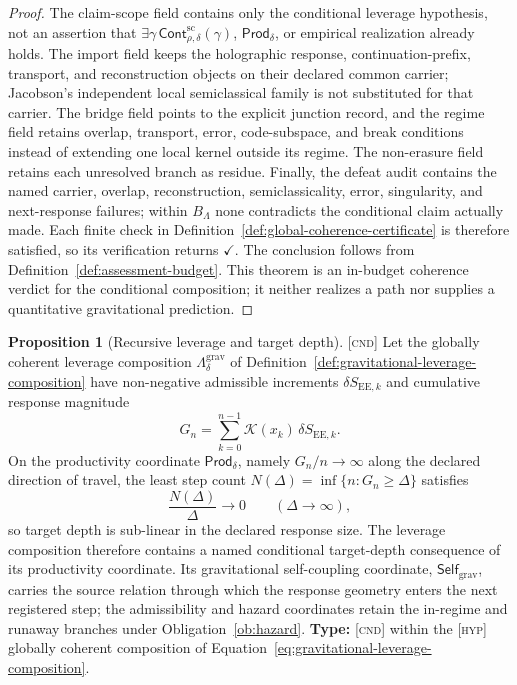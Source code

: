 \documentclass[11pt]{article}
\newcommand{\Cnd}{\textsc{[cnd]}}
\newcommand{\Hyp}{\textsc{[hyp]}}
\theoremstyle{definition}
\newtheorem{sproposition}{Proposition}
\begin{document}
\begin{proof}
The claim-scope field contains only the conditional leverage hypothesis, not an
assertion that $\exists\gamma\,\mathsf{Cont}^{\mathrm{sc}}_{\rho,\delta}(\gamma)$,
$\mathsf{Prod}_\delta$, or empirical realization already holds. The import field
keeps the holographic response, continuation-prefix, transport, and reconstruction
objects on their declared common carrier; Jacobson's independent local
semiclassical family is not substituted for that carrier. The bridge field points
to the explicit junction record, and the regime field retains overlap, transport,
error, code-subspace, and break conditions instead of extending one local kernel
outside its regime. The non-erasure field retains each unresolved branch as
residue. Finally, the defeat audit contains the named carrier, overlap,
reconstruction, semiclassicality, error, singularity, and next-response failures;
within $B_\Lambda$ none contradicts the conditional claim actually made. Each
finite check in Definition~\ref{def:global-coherence-certificate} is therefore
satisfied, so its verification returns $\checkmark$. The conclusion follows from
Definition~\ref{def:assessment-budget}. This theorem is an in-budget coherence
verdict for the conditional composition; it neither realizes a path nor supplies a
quantitative gravitational prediction.
\end{proof}

\begin{sproposition}[Recursive leverage and target depth]\label{prop:amplify}
\Cnd{} Let the globally coherent leverage composition
$\Lambda^{\mathrm{grav}}_\delta$ of
Definition~\ref{def:gravitational-leverage-composition} have non-negative
admissible increments $\delta S_{\mathrm{EE},k}$ and cumulative response magnitude
\begin{equation}
G_n=\sum_{k=0}^{n-1}\mathcal K(x_k)\,\delta S_{\mathrm{EE},k}.
\label{eq:cumulative-response}
\end{equation}
On the productivity coordinate $\mathsf{Prod}_{\delta}$, namely
$G_n/n\to\infty$ along the declared direction of travel, the least step count
$N(\Delta)=\inf\{n:G_n\geq\Delta\}$ satisfies
\begin{equation}
\frac{N(\Delta)}{\Delta}\longrightarrow 0
\qquad (\Delta\to\infty),
\end{equation}
so target depth is sub-linear in the declared response size. The leverage
composition therefore contains a named conditional target-depth consequence of its
productivity coordinate. Its gravitational self-coupling coordinate,
$\mathsf{Self}_{\mathrm{grav}}$, carries the source relation through which the
response geometry enters the next registered step; the admissibility and hazard
coordinates retain the in-regime and runaway branches under
Obligation~\ref{ob:hazard}. \textbf{Type:} \Cnd{} within the \Hyp{} globally
coherent composition of Equation~\eqref{eq:gravitational-leverage-composition}.
\end{sproposition}
\end{document}
